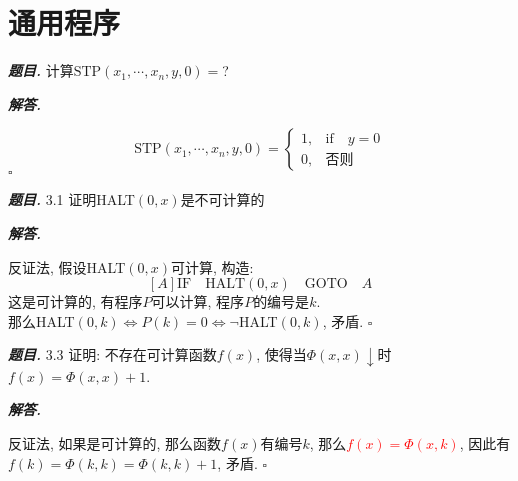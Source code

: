\documentclass[10pt, a4paper, oneside]{ctexart}
\newenvironment{problem}{\begin{framed}\par\noindent\textbf{\textit{题目. }}}{\end{framed}\par}
\newenvironment{solution}{%
  \par\noindent\textbf{\textit{解答. }}\ignorespaces
}{%
  \hfill\ensuremath{\square}\par
}
\begin{document}
\section{通用程序}

\begin{problem}
计算$\text{STP}(x_1,\cdots,x_n,y,0)=$?
\end{problem}
\begin{solution}
    $$\text{STP}(x_1,\cdots,x_n,y,0)=\begin{cases}
        1, & \text{if}\quad y=0\\
        0, &\text{否则} 
    \end{cases}$$
\end{solution}

\begin{problem}
    3.1 证明HALT$(0,x)$是不可计算的
\end{problem}
\begin{solution}
反证法, 假设HALT$(0,x)$可计算, 构造:
$$[A] \text{IF} \quad  \text{HALT}(0,x) \quad \text{GOTO} \quad A $$
这是可计算的, 有程序$P$可以计算, 程序$P$的编号是$k$.\\
那么HALT$(0,k) \iff P(k)=0 \iff \neg $HALT$(0,k)$, 矛盾.
\end{solution}

\begin{problem}
    3.3 证明: 不存在可计算函数$f(x)$, 使得当$\Phi(x,x)\downarrow$时$f(x) = \Phi(x,x)+1$.
\end{problem}
\begin{solution}
    反证法, 如果是可计算的, 那么函数$f(x)$有编号$k$, 那么\textcolor{red}{$f(x)=\Phi(x,k)$}, 因此有$f(k)=\Phi(k,k)=\Phi(k,k)+1$, 矛盾.
\end{solution}
\end{document}
